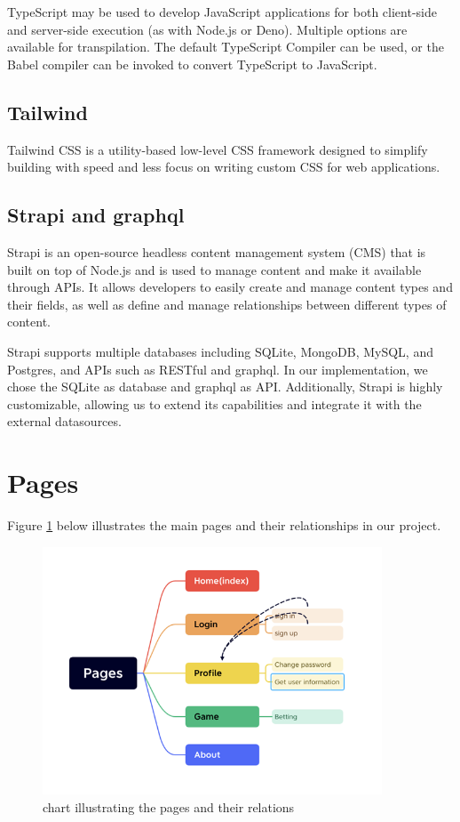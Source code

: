 \documentclass[singlecolumn]{article}
\begin{document}
TypeScript may be used to develop JavaScript applications for both client-side and server-side execution (as with Node.js or Deno). Multiple options are available for transpilation. The default TypeScript Compiler can be used, or the Babel compiler can be invoked to convert TypeScript to JavaScript.

\subsection{Tailwind}
Tailwind CSS is a utility-based low-level CSS framework designed to simplify building with speed and less focus on writing custom CSS for web applications.

\subsection{Strapi and graphql}
Strapi is an open-source headless content management system (CMS) that is built on top of Node.js and is used to manage content and make it available through APIs. It allows developers to easily create and manage content types and their fields, as well as define and manage relationships between different types of content.

Strapi supports multiple databases including SQLite, MongoDB, MySQL, and Postgres, and APIs such as RESTful and graphql. In our implementation, we chose the SQLite as database and graphql as API. Additionally, Strapi is highly customizable, allowing us to extend its capabilities and integrate it with the external datasources.


\section{Pages}
Figure \ref{fig:pages} below illustrates the main pages and their relationships in our project. 

\begin{figure}[H]
    \centering
    \includegraphics[width=0.9\textwidth]{pages.png}
    \caption{chart illustrating the pages and their relations}
    \label{fig:pages}
\end{figure}
\end{document}
